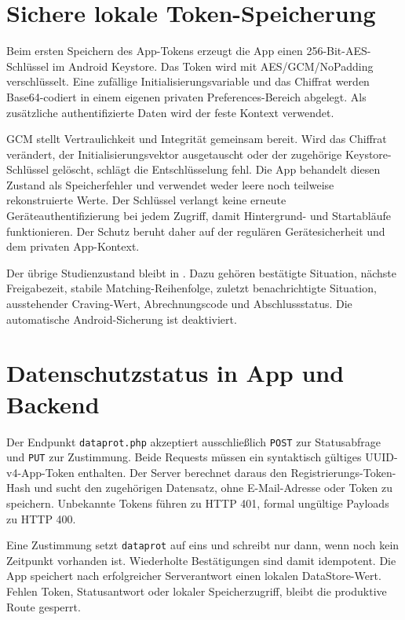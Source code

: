 \section{Sichere lokale Token-Speicherung}
Beim ersten Speichern des App-Tokens erzeugt die App einen 256-Bit-AES-Schlüssel im Android Keystore. Das Token wird mit AES/GCM/NoPadding verschlüsselt. Eine zufällige Initialisierungsvariable und das Chiffrat werden Base64-codiert in einem eigenen privaten Preferences-Bereich abgelegt. Als zusätzliche authentifizierte Daten wird der feste Kontext  verwendet.

GCM stellt Vertraulichkeit und Integrität gemeinsam bereit. Wird das Chiffrat verändert, der Initialisierungsvektor ausgetauscht oder der zugehörige Keystore-Schlüssel gelöscht, schlägt die Entschlüsselung fehl. Die App behandelt diesen Zustand als Speicherfehler und verwendet weder leere noch teilweise rekonstruierte Werte. Der Schlüssel verlangt keine erneute Geräteauthentifizierung bei jedem Zugriff, damit Hintergrund- und Startabläufe funktionieren. Der Schutz beruht daher auf der regulären Gerätesicherheit und dem privaten App-Kontext.

Der übrige Studienzustand bleibt in . Dazu gehören bestätigte Situation, nächste Freigabezeit, stabile Matching-Reihenfolge, zuletzt benachrichtigte Situation, ausstehender Craving-Wert, Abrechnungscode und Abschlussstatus. Die automatische Android-Sicherung ist deaktiviert.

\section{Datenschutzstatus in App und Backend}
Der Endpunkt \texttt{dataprot.php} akzeptiert ausschließlich \texttt{POST} zur Statusabfrage und \texttt{PUT} zur Zustimmung. Beide Requests müssen ein syntaktisch gültiges UUID-v4-App-Token enthalten. Der Server berechnet daraus den Registrierungs-Token-Hash und sucht den zugehörigen Datensatz, ohne E-Mail-Adresse oder Token zu speichern. Unbekannte Tokens führen zu HTTP 401, formal ungültige Payloads zu HTTP 400.

Eine Zustimmung setzt \texttt{dataprot} auf eins und schreibt  nur dann, wenn noch kein Zeitpunkt vorhanden ist. Wiederholte Bestätigungen sind damit idempotent. Die App speichert nach erfolgreicher Serverantwort einen lokalen DataStore-Wert. Fehlen Token, Statusantwort oder lokaler Speicherzugriff, bleibt die produktive Route gesperrt.

